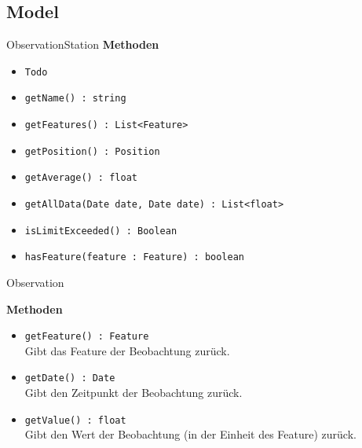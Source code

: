 \subsection{Model}

    \begin{Class}{ObservationStation}
        \textbf{Methoden}
        \begin{itemize}
            \item \texttt{Todo}
            \item \texttt{getName() : string}
            \item \texttt{getFeatures() : List<Feature>}
            \item \texttt{getPosition() : Position}
            \item \texttt{getAverage() : float}
            \item \texttt{getAllData(Date date, Date date) : List<float>}
            \item \texttt{isLimitExceeded() : Boolean}
            \item \texttt{hasFeature(feature : Feature) : boolean}
        \end{itemize}
    \end{Class}

    \begin{Class}{Observation}
        
        \textbf{Methoden}
        \begin{itemize}
            \item \texttt{getFeature() : Feature}
            \\ Gibt das Feature der Beobachtung zurück.
            \item \texttt{getDate() : Date}
            \\ Gibt den Zeitpunkt der Beobachtung zurück.
            \item \texttt{getValue() : float}
            \\ Gibt den Wert der Beobachtung (in der Einheit des Feature) zurück.
        \end{itemize}
    \end{Class}

